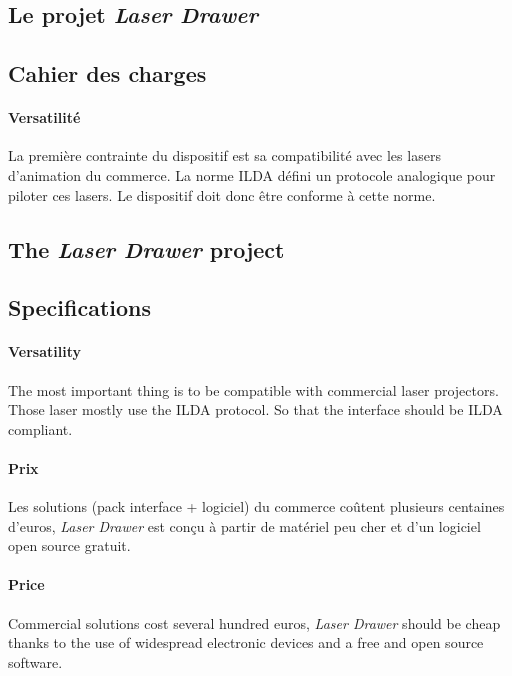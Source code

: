 \clearpage

\begin{fr}
\section{Le projet \textit{Laser Drawer}}
\subsection{Cahier des charges}
\paragraph*{Versatilité}
La première contrainte du dispositif est sa compatibilité avec les lasers d'animation du commerce. 
La norme ILDA défini un protocole analogique pour piloter ces lasers. 
Le dispositif doit donc être conforme à cette norme.
\end{fr}

\begin{en}
\section{The \textit{Laser Drawer} project}
\label{sec:laser_drawer_project}
\subsection{Specifications}
\paragraph{Versatility}
The most important thing is to be compatible with commercial laser projectors.
Those laser mostly use the ILDA protocol.
So that the interface should be ILDA compliant.
\end{en}

\begin{fr}
\paragraph*{Prix}
Les solutions (pack interface + logiciel) du commerce coûtent plusieurs centaines d'euros, \textit{Laser Drawer} est conçu à partir de matériel peu cher et d'un logiciel open source gratuit.
\end{fr}

\begin{en}
\paragraph*{Price}
Commercial solutions cost several hundred euros, \textit{Laser Drawer} should be cheap thanks to the use of widespread electronic devices and a free and open source software.
\end{en}

